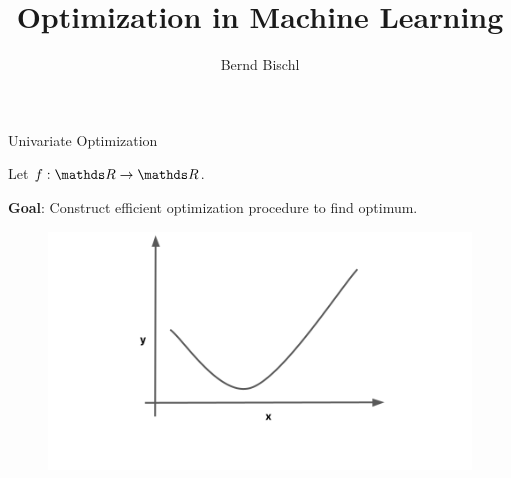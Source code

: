 \documentclass[11pt,compress,t,notes=noshow, xcolor=table]{beamer}
\title{Optimization in Machine Learning}
\author{Bernd Bischl}
\date{}
\begin{document}
\sloppy

\begin{vbframe}{Univariate Optimization}

Let $f: \R \to \R$. 

\lz 

\textbf{Goal}: Construct efficient optimization procedure to find optimum. 

\vspace*{0.2cm} 

\begin{figure}
  \includegraphics{figure_man/golden-ratio-0.png}
\end{figure}

\end{vbframe}
\end{document}
